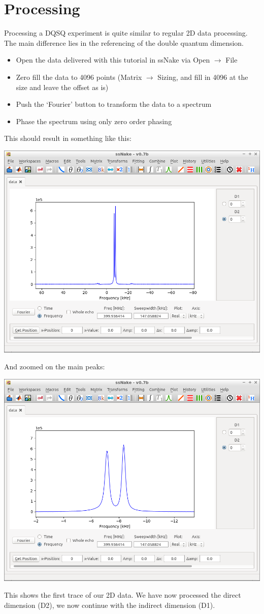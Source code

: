 \documentclass[11pt,a4paper]{article}
\begin{document}
\section{Processing}
Processing a DQSQ experiment is quite similar to regular 2D data processing.
The main difference lies in the referencing of the double quantum  dimension.

\begin{itemize}
  \item Open the data delivered with this tutorial in ssNake via Open $\longrightarrow$ File
	\item Zero fill the data to 4096 points (Matrix $\longrightarrow$ Sizing, and fill in 4096 at the
	  size and leave the offset as is)
	\item Push the `Fourier' button to transform the data to a spectrum
	\item Phase the spectrum using only zero order phasing
\end{itemize}
This should result in something like this:
\begin{center}
\includegraphics[width=0.7\linewidth]{Figs/Fig1.png}
\end{center}
And zoomed on the main peaks:
\begin{center}
\includegraphics[width=0.7\linewidth]{Figs/Fig2.png}
\end{center}
This shows the first trace of our 2D data.
We have now processed the direct dimension (D2), we now continue with the indirect dimension (D1).
\end{document}
